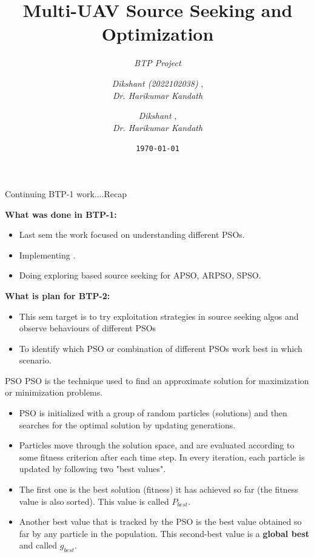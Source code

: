 \documentclass[aspectratio=169]{beamer}
\title{\textbf{Multi-UAV Source Seeking and Optimization}}
\subtitle{\textit{BTP Project}}
\author{
    \textit{Dikshant (2022102038) }, \\
    \textit{Dr. Harikumar Kandath}
}
\date{\texttt{\today}}
\begin{document}
\begin{frame}
\titlepage 
\end{frame}
\author{
    \textit{Dikshant }, \\
    \textit{Dr. Harikumar Kandath}
}

\begin{frame}{Continuing BTP-1 work....Recap}

    \textbf{What was done in BTP-1:}
    \begin{itemize}
	\item Last sem the work focused on understanding different PSOs.	
	\item Implementing \cite{10312321}. 
	\item Doing exploring based source seeking for APSO, ARPSO, SPSO.
    \end{itemize}

    \textbf{What is plan for BTP-2:}
    \begin{itemize}
	\item This sem target is to try exploitation strategies in source seeking
		algos and observe behaviours of different PSOs
	\item To identify which PSO or combination of different PSOs work best in which scenario.
    \end{itemize}
\end{frame} 
\begin{frame}{PSO}
    PSO is the technique used to find an approximate solution for maximization or minimization problems.
    \begin{itemize}
        \item PSO is initialized with a group of random particles (solutions) and then searches for the optimal solution by updating generations.
        \item Particles move through the solution space, and are evaluated according to some fitness criterion after each time step. In every iteration, each particle is updated by following two "best values".
        \item The first one is the best solution (fitness) it has achieved so far (the fitness value is also sorted). This value is called \textbf{$P_{best}$}.
        \item Another best value that is tracked by the PSO is the best value obtained so far by any particle in the population. This second-best value is a \textbf{global best} and called \textbf{$g_{best}$}.
    \end{itemize}
\end{frame}
\end{document}

